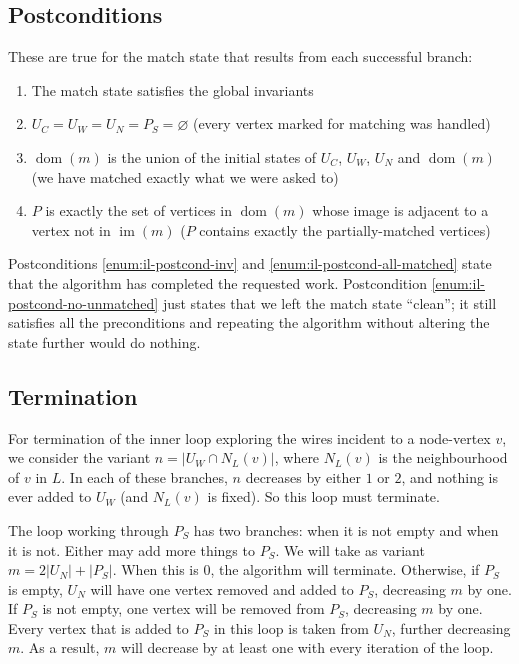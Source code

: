 \documentclass{article}
\DeclareMathOperator{\dom}{dom}
\DeclareMathOperator{\im}{im}
\begin{document}
\subsection{Postconditions}
These are true for the match state that results from each successful branch:
\begin{enumerate}
  \renewcommand{\theenumi}{(\Roman{enumi})}
  \renewcommand{\labelenumi}{\theenumi}
  \item \label{enum:il-postcond-inv} The match state satisfies the global invariants
  \item \label{enum:il-postcond-no-unmatched} $U_C = U_W = U_N = P_S = \varnothing$ (every vertex marked for matching was handled)
  \item \label{enum:il-postcond-all-matched} $\dom(m)$ is the union of the initial states of $U_C$, $U_W$, $U_N$ and $\dom(m)$ (we have matched exactly what we were asked to)
  \item \label{enum:il-postcond-P} $P$ is exactly the set of vertices in $\dom(m)$ whose image is adjacent to a vertex not in $\im(m)$ ($P$ contains exactly the partially-matched vertices)
\end{enumerate}

Postconditions \ref{enum:il-postcond-inv} and \ref{enum:il-postcond-all-matched} state that the algorithm has completed the requested work.  Postcondition \ref{enum:il-postcond-no-unmatched} just states that we left the match state ``clean''; it still satisfies all the preconditions and repeating the algorithm without altering the state further would do nothing.

\subsection{Termination}
\label{sec:termination}

For termination of the inner loop exploring the wires incident to a node-vertex $v$, we consider the variant $n = |U_W\cap N_L(v)|$, where $N_L(v)$ is the neighbourhood of $v$ in $L$.  In each of these branches, $n$ decreases by either $1$ or $2$, and nothing is ever added to $U_W$ (and $N_L(v)$ is fixed).  So this loop must terminate.

The loop working through $P_S$ has two branches: when it is not empty and when it is not.  Either may add more things to $P_S$.  We will take as variant $m = 2|U_N| + |P_S|$.  When this is $0$, the algorithm will terminate.  Otherwise, if $P_S$ is empty, $U_N$ will have one vertex removed and added to $P_S$, decreasing $m$ by one.  If $P_S$ is not empty, one vertex will be removed from $P_S$, decreasing $m$ by one.  Every vertex that is added to $P_S$ in this loop is taken from $U_N$, further decreasing $m$.  As a result, $m$ will decrease by at least one with every iteration of the loop.
\end{document}

